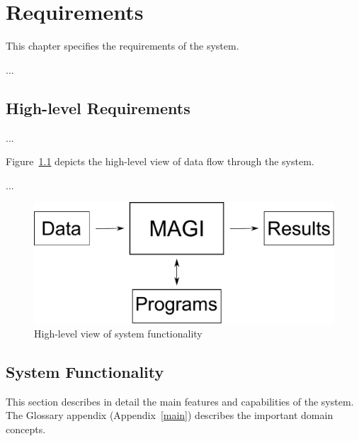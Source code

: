 
\chapter{Requirements}
\label{chap:requirements}


This chapter specifies the requirements of the system.  

...




\section{High-level Requirements}
\label{sec:requirements}

...

Figure~\ref{fig:highlevelview} depicts the high-level view of
data flow through the system. 

...



\begin{figure}[!htpb]
  \centering
  \includegraphics[width=.8\textwidth]{diagrams/System}
  \caption{High-level view of system functionality}
  \label{fig:highlevelview}
\end{figure}



\section{System Functionality}
\label{sec:systemfunction}

This section describes in detail the main features and capabilities of
the system. The Glossary appendix (Appendix~\ref{main}) 
describes the important domain concepts.




